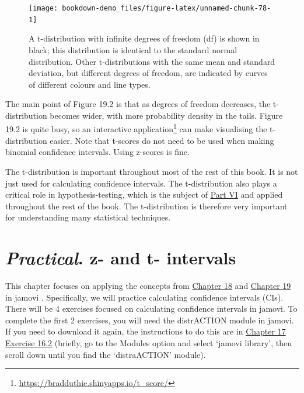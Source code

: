 \documentclass[
  openany]{scrbook}
\begin{document}
\begin{figure}
\texttt{[image: bookdown-demo\_files/figure-latex/unnamed-chunk-78-1]} \caption{A t-distribution with infinite degrees of freedom (df) is shown in black; this distribution is identical to the standard normal distribution. Other t-distributions with the same mean and standard deviation, but different degrees of freedom, are indicated by curves of different colours and line types.}\label{fig:unnamed-chunk-78}
\end{figure}

The main point of Figure 19.2 is that as degrees of freedom decreases, the t-distribution becomes wider, with more probability density in the tails.
Figure 19.2 is quite busy, so an interactive application\footnote{\url{https://bradduthie.shinyapps.io/t_score/}} can make visualising the t-distribution easier.
Note that t-scores do not need to be used when making binomial confidence intervals.
Using z-scores is fine.

The t-distribution is important throughout most of the rest of this book.
It is not just used for calculating confidence intervals.
The t-distribution also plays a critical role in hypothesis-testing, which is the subject of \protect\hyperlink{Week_6}{Part VI} and applied throughout the rest of the book.
The t-distribution is therefore very important for understanding many statistical techniques.

\hypertarget{Chapter_20}{%
\chapter{\texorpdfstring{\emph{Practical}. z- and t- intervals}{Practical. z- and t- intervals}}\label{Chapter_20}}

This chapter focuses on applying the concepts from \protect\hyperlink{Chapter_18}{Chapter 18} and \protect\hyperlink{Chapter_19}{Chapter 19} in jamovi \citep{Jamovi2022}.
Specifically, we will practice calculating confidence intervals (CIs).
There will be 4 exercises focused on calculating confidence intervals in jamovi.
To complete the first 2 exercises, you will need the distrACTION module in jamovi.
If you need to download it again, the instructions to do this are in \protect\hyperlink{Chapter_17}{Chapter 17} \href{https://bradduthie.github.io/SCIU4T4/Chapter_17.html\#probabilities-from-a-normal-distribution}{Exercise 16.2} (briefly, go to the Modules option and select `jamovi library', then scroll down until you find the `distraACTION' module).
\end{document}
